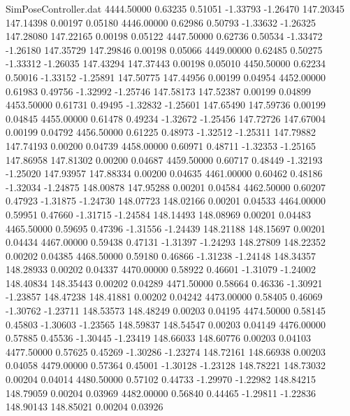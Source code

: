 \begin{filecontents}{SimPoseController.dat}
4444.50000    0.63235    0.51051    -1.33793   -1.26470  147.20345  147.14398    0.00197    0.05180
4446.00000    0.62986    0.50793    -1.33632   -1.26325  147.28080  147.22165    0.00198    0.05122
4447.50000    0.62736    0.50534    -1.33472   -1.26180  147.35729  147.29846    0.00198    0.05066
4449.00000    0.62485    0.50275    -1.33312   -1.26035  147.43294  147.37443    0.00198    0.05010
4450.50000    0.62234    0.50016    -1.33152   -1.25891  147.50775  147.44956    0.00199    0.04954
4452.00000    0.61983    0.49756    -1.32992   -1.25746  147.58173  147.52387    0.00199    0.04899
4453.50000    0.61731    0.49495    -1.32832   -1.25601  147.65490  147.59736    0.00199    0.04845
4455.00000    0.61478    0.49234    -1.32672   -1.25456  147.72726  147.67004    0.00199    0.04792
4456.50000    0.61225    0.48973    -1.32512   -1.25311  147.79882  147.74193    0.00200    0.04739
4458.00000    0.60971    0.48711    -1.32353   -1.25165  147.86958  147.81302    0.00200    0.04687
4459.50000    0.60717    0.48449    -1.32193   -1.25020  147.93957  147.88334    0.00200    0.04635
4461.00000    0.60462    0.48186    -1.32034   -1.24875  148.00878  147.95288    0.00201    0.04584
4462.50000    0.60207    0.47923    -1.31875   -1.24730  148.07723  148.02166    0.00201    0.04533
4464.00000    0.59951    0.47660    -1.31715   -1.24584  148.14493  148.08969    0.00201    0.04483
4465.50000    0.59695    0.47396    -1.31556   -1.24439  148.21188  148.15697    0.00201    0.04434
4467.00000    0.59438    0.47131    -1.31397   -1.24293  148.27809  148.22352    0.00202    0.04385
4468.50000    0.59180    0.46866    -1.31238   -1.24148  148.34357  148.28933    0.00202    0.04337
4470.00000    0.58922    0.46601    -1.31079   -1.24002  148.40834  148.35443    0.00202    0.04289
4471.50000    0.58664    0.46336    -1.30921   -1.23857  148.47238  148.41881    0.00202    0.04242
4473.00000    0.58405    0.46069    -1.30762   -1.23711  148.53573  148.48249    0.00203    0.04195
4474.50000    0.58145    0.45803    -1.30603   -1.23565  148.59837  148.54547    0.00203    0.04149
4476.00000    0.57885    0.45536    -1.30445   -1.23419  148.66033  148.60776    0.00203    0.04103
4477.50000    0.57625    0.45269    -1.30286   -1.23274  148.72161  148.66938    0.00203    0.04058
4479.00000    0.57364    0.45001    -1.30128   -1.23128  148.78221  148.73032    0.00204    0.04014
4480.50000    0.57102    0.44733    -1.29970   -1.22982  148.84215  148.79059    0.00204    0.03969
4482.00000    0.56840    0.44465    -1.29811   -1.22836  148.90143  148.85021    0.00204    0.03926

\end{filecontents}
